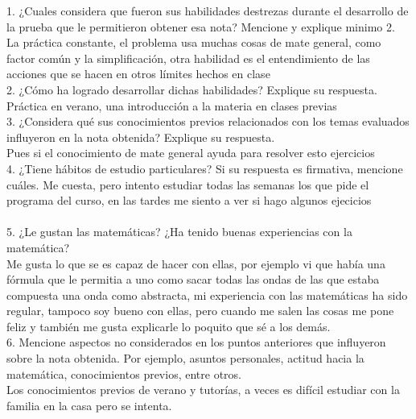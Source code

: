 \documentclass{article}
\theoremstyle{mytheoremstyle}
\theoremstyle{mytheoremstyle}
\theoremstyle{myproblemstyle}
\begin{document}
    1.	¿Cuales considera que fueron sus habilidades destrezas durante el desarrollo de la prueba que le permitieron obtener esa nota? Mencione y explique minimo 2.\\
    La práctica constante, el problema usa muchas cosas de mate general, como factor común 
    y la simplificación, otra habilidad es el entendimiento de las acciones que se hacen en otros límites hechos en clase
    \\2.	¿Cómo ha logrado desarrollar dichas habilidades? Explique su respuesta.\\
    Práctica en verano, una introducción a la materia en clases previas
    \\3.	¿Considera qué sus conocimientos previos relacionados con los temas evaluados influyeron 
    en la nota obtenida? Explique su respuesta.\\
    Pues si el conocimiento de mate general ayuda para resolver esto ejercicios
    \\4.	¿Tiene hábitos de estudio particulares? 
    Si su respuesta es firmativa, mencione cuáles.
    Me cuesta, pero intento estudiar todas las semanas los que pide el programa del curso, en las tardes me siento a 
    ver si hago algunos ejecicios\\
    \\5.	¿Le gustan las matemáticas? ¿Ha tenido buenas experiencias con la matemática? \\
    Me gusta lo que se es capaz de hacer con ellas, por ejemplo vi que había una fórmula que le permitia a 
    uno como sacar todas las ondas de las que estaba compuesta una onda como abstracta, mi experiencia con las matemáticas
    ha sido regular, tampoco soy bueno con ellas, pero cuando me salen las cosas me pone feliz y también me gusta
    explicarle lo poquito que sé a los demás.
    \\6.	Mencione aspectos no considerados en los puntos anteriores que influyeron sobre la nota obtenida. 
    Por ejemplo, asuntos personales, actitud hacia la matemática, conocimientos previos, entre otros.\\
    Los conocimientos previos de verano y tutorías, a veces es difícil estudiar con la familia en la casa pero
    se intenta.
\end{document}
